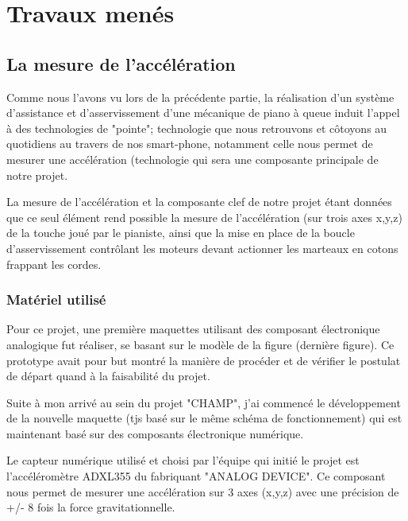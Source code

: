 \documentclass[french,a4paper,12pt]{report}
\begin{document}
%
%
\part{Travaux menés}

\chapter{La mesure de l'accélération}

Comme nous l'avons vu lors de la précédente partie, la réalisation d'un système d'assistance et d'asservissement d'une mécanique de piano à queue induit l'appel à des technologies de "pointe"; technologie que nous retrouvons et côtoyons au quotidiens au travers de nos smart-phone, notamment celle nous permet de mesurer une accélération (technologie qui sera une composante principale de notre projet.

La mesure de l'accélération et la composante clef de notre projet étant données que ce seul élément rend possible la mesure de l'accélération (sur trois axes x,y,z) de la touche joué par le pianiste, ainsi que la mise en place de la boucle d'asservissement contrôlant les moteurs devant actionner les marteaux en cotons frappant les cordes.

\section{Matériel utilisé}
Pour ce projet, une première maquettes utilisant des composant électronique analogique fut réaliser, se basant sur le modèle de la figure (dernière figure). Ce prototype avait pour but montré la manière de procéder et de vérifier le postulat de départ quand à la faisabilité du projet.


Suite à mon arrivé au sein du projet "CHAMP", j'ai commencé le développement de la nouvelle maquette (tjs basé sur le même schéma de fonctionnement) qui est maintenant basé sur des composants électronique numérique.

Le capteur numérique utilisé et choisi par l'équipe qui initié le projet est l'accéléromètre ADXL355 du fabriquant "ANALOG DEVICE". Ce composant nous permet de mesurer une accélération sur 3 axes (x,y,z) avec une précision de +/- 8 fois la force gravitationnelle.
\end{document}
